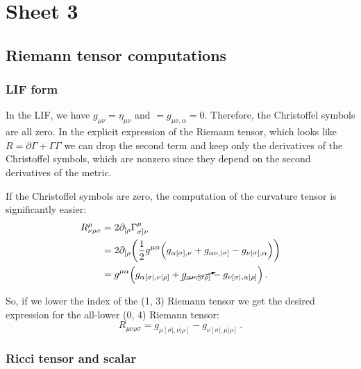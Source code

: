 \documentclass[main.tex]{subfiles}
\begin{document}
\section{Sheet 3}

\subsection{Riemann tensor computations}

\subsubsection{LIF form}

In the LIF, we have \(g_{\mu \nu } = \eta_{\mu \nu }\) and \(= g_{\mu \nu , \alpha }=0\). Therefore, the Christoffel symbols are all zero. 
In the explicit expression of the Riemann tensor, which looks like \(R = \partial \Gamma  + \Gamma \Gamma\) we can drop the second term and keep only the derivatives of the Christoffel symbols, which are nonzero since they depend on the second derivatives of the metric.

If the Christoffel symbols are zero, the computation of the curvature tensor is significantly easier: 
%
\begin{subequations}
\begin{align}
  R^{\mu }_{\nu \rho \sigma }
  &=  2 \partial_{[\rho }\Gamma^{\mu }_{\sigma ] \nu}  \\
  &= 2 \partial_{[\rho } \qty(\frac{1}{2} g^{\mu \alpha } \qty(g_{\alpha |\sigma ], \nu } + g_{\alpha \nu  , |\sigma  ]} - g_{\nu  |\sigma], \alpha }))  \\
  &= g^{\mu \alpha }\qty(g_{\alpha [\sigma |, \nu | \rho      ]} + \cancelto{}{g_{\alpha \nu, [\sigma \rho]}}-g_{\nu [\sigma |, \alpha | \rho  ]})
\,.
\end{align}
\end{subequations}

So, if we lower the index of the (1, 3) Riemann tensor we get the desired expression for the all-lower (0, 4) Riemann tensor: 
%
\begin{equation}
  R_{\mu \nu \rho \sigma} = g_{\mu [\sigma |, \nu |\rho ]} - g_{\nu  [\sigma |, \mu | \rho ]} 
\,.
\end{equation}

\subsubsection{Ricci tensor and scalar}
\end{document}
